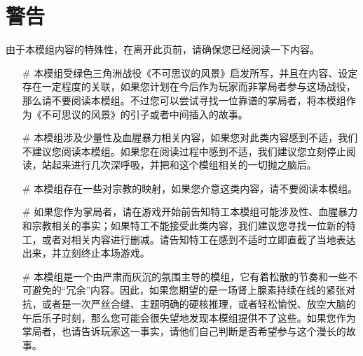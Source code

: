 \section{警告}

由于本模组内容的特殊性，在离开此页前，请确保您已经阅读一下内容。

\begin{itemize}
    \item[\#] 本模组受绿色三角洲战役《不可思议的风景》启发所写，并且在内容、设定存在一定程度的关联，如果您计划在今后作为玩家而非掌局者参与这场战役，那么请不要阅读本模组。不过您可以尝试寻找一位靠谱的掌局者，将本模组作为《不可思议的风景》的引子或者中间插入的故事。
    \item[\#] 本模组涉及少量性及血腥暴力相关内容，如果您对此类内容感到不适，我们不建议您阅读本模组。如果您在阅读过程中感到不适，我们建议您立刻停止阅读，站起来进行几次深呼吸，并把和这个模组相关的一切抛之脑后。
    \item[\#] 本模组存在一些对宗教的映射，如果您介意这类内容，请不要阅读本模组。
    \item[\#] 如果您作为掌局者，请在游戏开始前告知特工本模组可能涉及性、血腥暴力和宗教相关的事实；如果特工不能接受此类内容，我们建议您寻找一位新的特工，或者对相关内容进行删减。请告知特工在感到不适时立即直截了当地表达出来，并立刻终止本场游戏。
    \item[\#] 本模组是一个由严肃而灰沉的氛围主导的模组，它有着松散的节奏和一些不可避免的“冗余”内容。因此，如果您期望的是一场肾上腺素持续在线的紧张对抗，或者是一次严丝合缝、主题明确的硬核推理，或者轻松愉悦、放空大脑的午后乐子时刻，那么您可能会很失望地发现本模组提供不了这些。如果您作为掌局者，也请告诉玩家这一事实，请他们自己判断是否希望参与这个漫长的故事。
\end{itemize}